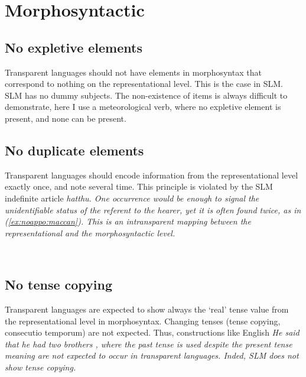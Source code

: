 \documentclass[a4paper]{article}
\begin{document}
 

\section{Morphosyntactic}
\subsection{No expletive elements}
Transparent languages should not have elements in morphosyntax that correspond to nothing on the representational level. This is the case in SLM. SLM has no dummy subjects. The non-existence of items is always difficult to demonstrate, here I use a meteorological verb, where no expletive element is present, and none can be present.


\subsection{No duplicate elements}
Transparent languages should encode information from the representational level exactly once, and note several time. This principle is violated by the SLM indefinite article \em hatthu\em. One occurrence would be enough to signal the unidentifiable status of the referent to the hearer, yet it is often found twice, as in (\ref{ex:noappo:maccan}). This is an intransparent mapping between the representational and the morphosyntactic level.


 \\

\subsection{No tense copying}
Transparent languages are expected to show always the `real' tense value from the representational level in morphosyntax. Changing tenses (tense copying, consecutio temporum) are not expected. Thus, constructions like English \em He said that he had two brothers \em, where the past tense is used despite the present tense meaning are not expected to occur in transparent languages. Inded, SLM does not show tense copying.
\end{document}
